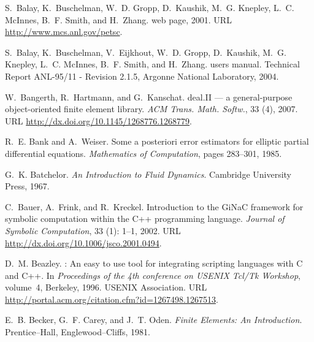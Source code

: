 \begin{thebibliography}{467}
S.~Balay, K.~Buschelman, W.~D. Gropp, D.~Kaushik, M.~G. Knepley, L.~C. McInnes,
  B.~F. Smith, and H.~Zhang.
 web page, 2001.
\newblock URL \url{http://www.mcs.anl.gov/petsc}.

S.~Balay, K.~Buschelman, V.~Eijkhout, W.~D. Gropp, D.~Kaushik, M.~G. Knepley,
  L.~C. McInnes, B.~F. Smith, and H.~Zhang.
 users manual.
\newblock Technical Report ANL-95/11 - Revision 2.1.5, Argonne National
  Laboratory, 2004.

W.~Bangerth, R.~Hartmann, and G.~Kanschat.
\newblock deal.{II} --- a general-purpose object-oriented finite element
  library.
\newblock \emph{ACM Trans. Math. Softw.}, 33 (4), 2007.
\newblock URL \url{http://dx.doi.org/10.1145/1268776.1268779}.

R.~E. Bank and A.~Weiser.
\newblock Some a posteriori error estimators for elliptic partial differential
  equations.
\newblock \emph{Mathematics of Computation}, pages 283--301, 1985.

G.~K. Batchelor.
\newblock \emph{An Introduction to Fluid Dynamics}.
\newblock Cambridge University Press, 1967.

C.~Bauer, A.~Frink, and R.~Kreckel.
\newblock Introduction to the {GiNaC} framework for symbolic computation within
  the {C++} programming language.
\newblock \emph{Journal of Symbolic Computation}, 33 (1):
  1--1, 2002.
\newblock URL \url{http://dx.doi.org/10.1006/jsco.2001.0494}.

D.~M. Beazley.
: {A}n easy to use tool for integrating scripting languages
  with {C} and {C++}.
\newblock In \emph{Proceedings of the 4th conference on USENIX Tcl/Tk
  Workshop}, volume~4, Berkeley, 1996. USENIX Association.
\newblock URL \url{http://portal.acm.org/citation.cfm?id=1267498.1267513}.

E.~B. Becker, G.~F. Carey, and J.~T. Oden.
\newblock \emph{Finite Elements: An Introduction}.
\newblock Prentice--Hall, Englewood--Cliffs, 1981.


\end{thebibliography}
